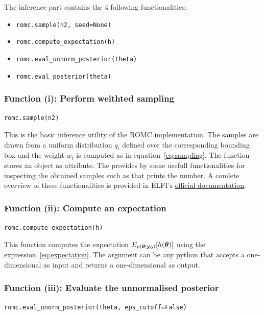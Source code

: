 The inference part contains the 4 following functionalities:

\begin{itemize}
\item \texttt{romc.sample(n2, seed=None)}
\item \texttt{romc.compute_expectation(h)}  
\item \texttt{romc.eval_unnorm_posterior(theta)}
\item \texttt{romc.eval_posterior(theta)}
\end{itemize}

\subsubsection*{Function (i): Perform weithted sampling}

\texttt{romc.sample(n2)}

\vspace{5mm}
\noindent
This is the basic inference utility of the ROMC implementation. The
samples are drawn from a uniform distribution $q_i$ defined over the
corresponding bounding box and the weight $w_i$ is computed as in
equation~\eqref{eq:sampling}. The function stores an
 object as  attribute. The
 provides by some usefull functionalities for
inspecting the obtained samples such as
 that prints the number. A comlete
overview of these functionalities is provided in ELFI's
\href{https://elfi.readthedocs.io/en/latest/api.html#elfi.methods.results.Sample}{official
  documentation}.

\subsubsection*{Function (ii): Compute an expectation}

\texttt{romc.compute_expectation(h)}
\vspace{5mm}
\noindent

This function computes the expectation
$E_{p(\boldsymbol{\theta}|\mathbf{y_0})}[h(\boldsymbol{\theta})]$ using the
expression~\eqref{eq:expectation}. The argument  can be
any python  that accepts a one-dimensional
 as input and returns a one-dimensional
 as output.

\subsubsection*{Function (iii): Evaluate the unnormalised posterior}
\texttt{romc.eval_unorm_posterior(theta, eps_cutoff=False)}
\vspace{5mm}
\noindent

